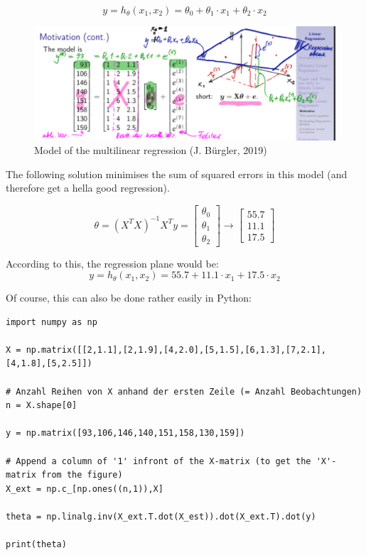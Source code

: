 \documentclass[11pt]{article}
\begin{document}
\vspace{10px}

\begin{equation*}
    y = h_\theta (x_1, x_2) = \theta_0 + \theta_1 \cdot x_1 + \theta_2 \cdot x_2
\end{equation*}

\begin{figure}[htb!]
    \centering
    \includegraphics[keepaspectratio=true, width=\linewidth]{multilinear_regression.png}
    \caption{Model of the multilinear regression (\textcopyright J. Bürgler, 2019)}
    \label{multilinear_regression}
\end{figure}

The following solution minimises the sum of squared errors in this model (and therefore get a hella good regression).

\begin{equation*}
    \theta = (X^T X)^{-1} X^T y =
    \begin{bmatrix}
        \theta_0 \\
        \theta_1 \\
        \theta_2
    \end{bmatrix}
    \rightarrow
    \begin{bmatrix}
        55.7 \\
        11.1 \\
        17.5
    \end{bmatrix}
\end{equation*}

According to this, the regression plane would be:
\begin{equation*}
    y = h_\theta (x_1, x_2) = 55.7 + 11.1 \cdot x_1 + 17.5 \cdot x_2
\end{equation*}

\newpage

Of course, this can also be done rather easily in Python:

\begin{lstlisting}
import numpy as np

X = np.matrix([[2,1.1],[2,1.9],[4,2.0],[5,1.5],[6,1.3],[7,2.1],[4,1.8],[5,2.5]])

# Anzahl Reihen von X anhand der ersten Zeile (= Anzahl Beobachtungen)
n = X.shape[0]

y = np.matrix([93,106,146,140,151,158,130,159])

# Append a column of '1' infront of the X-matrix (to get the 'X'-matrix from the figure) 
X_ext = np.c_[np.ones((n,1)),X]

theta = np.linalg.inv(X_ext.T.dot(X_est)).dot(X_ext.T).dot(y)

print(theta)
        \end{lstlisting}
\end{document}
